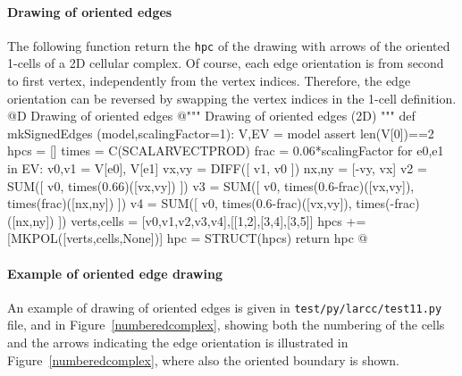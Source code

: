 \documentclass[11pt,oneside]{article}	%
\begin{document}
\paragraph{Drawing of oriented edges}
The following function return the \texttt{hpc} of the drawing with arrows of the oriented 1-cells of a 2D cellular complex. Of course, each edge orientation is from second to first vertex, independently from the vertex indices. Therefore, the edge orientation can be reversed by swapping the vertex indices in the 1-cell definition. 
@D Drawing of oriented edges
@{""" Drawing of oriented edges (2D) """
def mkSignedEdges (model,scalingFactor=1):
	V,EV = model
	assert len(V[0])==2
	hpcs = []
	times = C(SCALARVECTPROD)
	frac = 0.06*scalingFactor
	for e0,e1 in EV:
		v0,v1 = V[e0], V[e1]
		vx,vy = DIFF([ v1, v0 ])
		nx,ny = [-vy, vx]
		v2 = SUM([ v0, times(0.66)([vx,vy]) ])
		v3 = SUM([ v0, times(0.6-frac)([vx,vy]), times(frac)([nx,ny]) ])
		v4 = SUM([ v0, times(0.6-frac)([vx,vy]), times(-frac)([nx,ny]) ])
		verts,cells = [v0,v1,v2,v3,v4],[[1,2],[3,4],[3,5]]
		hpcs += [MKPOL([verts,cells,None])]
	hpc = STRUCT(hpcs)
	return hpc
@}

\paragraph{Example of oriented edge drawing}
An example of drawing of oriented edges is given in \texttt{test/py/larcc/test11.py} file, and in Figure~\ref{numberedcomplex}, showing both the numbering of the cells and the arrows indicating the edge orientation is illustrated in Figure~\ref{numberedcomplex}, where also the oriented boundary is shown.
\end{document}
